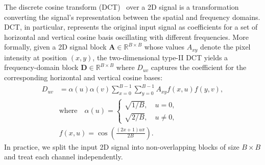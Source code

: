 % 
The discrete cosine transform (DCT)~\cite{ahmed2006discrete} over a 2D signal is a transformation converting the signal's representation between the spatial and frequency domains. DCT, in particular, represents the original input signal as coefficients for a set of horizontal and vertical cosine basis oscillating with different frequencies. %
More formally, given a 2D signal block $\mathbf{A} \in \mathbb{R}^{B \times B}$ whose values $A_{xy}$ denote the pixel intensity at position $(x,y)$, %
the two-dimensional type-II DCT yields a frequency-domain block $\mathbf{D} \in \mathbb{R}^{B \times B}$ where $D_{uv}$ captures the coefficient for the corresponding horizontal and vertical cosine bases:
\begin{align}
D_{uv} &= \alpha(u) \alpha(v) \sum_{x=0}^{B-1}\sum_{y=0}^{B-1} A_{xy} f(x, u) f(y, v), \nonumber \\ 
& \text{where} \quad \alpha(u) = \left\{\begin{matrix} 
\sqrt{1/B}, \quad u=0, \\
\sqrt{2/B}, \quad u\neq0,
\end{matrix}\right. \nonumber \\
& f(x, u) = \cos\left(\tfrac{(2x+1) u \pi}{2B}\right). \nonumber
\end{align}
In practice, we split the input 2D signal into non-overlapping blocks of size $B\times B$ and treat each channel independently.

